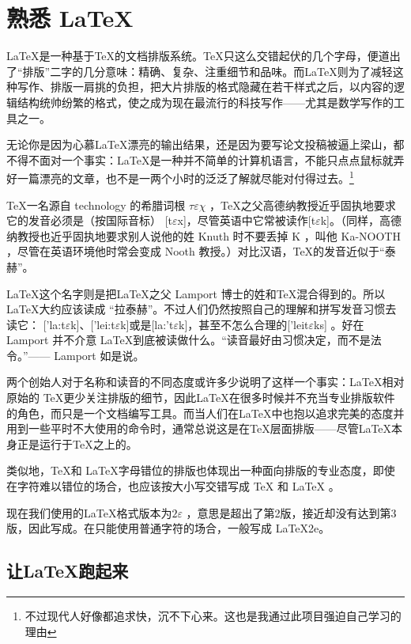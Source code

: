 \chapter{熟悉 \LaTeX}

\LaTeX 是一种基于\TeX 的文档排版系统。\TeX 只这么交错起伏的几个字母，便道出了“排版”二字的几分意味：精确、复杂、注重细节和品味。而\LaTeX 则为了减轻这种写作、排版一肩挑的负担，把大片排版的格式隐藏在若干样式之后，以内容的逻辑结构统帅纷繁的格式，使之成为现在最流行的科技写作——尤其是数学写作的工具之一。

无论你是因为心慕\LaTeX 漂亮的输出结果，还是因为要写论文投稿被逼上梁山，都不得不面对一个事实：\LaTeX 是一种并不简单的计算机语言，不能只点点鼠标就弄好一篇漂亮的文章，也不是一两个小时的泛泛了解就尽能对付得过去。\footnote{不过现代人好像都追求快，沉不下心来。这也是我通过此项目强迫自己学习的理由}

{
    \qquad \TeX 一名源自 technology 的希腊词根 $\tau \varepsilon \chi$ ，\TeX 之父高德纳教授近乎固执地要求它的发音必须是（按国际音标） [t$\varepsilon$x]，尽管英语中它常被读作[t$\varepsilon$k]。（同样，高德纳教授也近乎固执地要求别人说他的姓 Knuth 时不要丢掉 K ，叫他 Ka-NOOTH ，尽管在英语环境他时常会变成 Nooth 教授。）对比汉语，\TeX 的发音近似于“泰赫”。
    
    \qquad \LaTeX 这个名字则是把\LaTeX 之父 Lamport 博士的姓和\TeX 混合得到的。所以\LaTeX 大约应该读成 “拉泰赫”。不过人们仍然按照自己的理解和拼写发音习惯去读它：
    ['la:t$\varepsilon$k]、['lei:t$\varepsilon$k]或是[la:'t$\varepsilon$k]，甚至不怎么合理的['leit$\varepsilon$ks] \footnotemark 。好在 Lamport 并不介意 \LaTeX 到底被读做什么。“读音最好由习惯决定，而不是法令。”—— Lamport 如是说。

    \qquad 两个创始人对于名称和读音的不同态度或许多少说明了这样一个事实：\LaTeX 相对原始的 \TeX 更少关注排版的细节，因此\LaTeX 在很多时候并不充当专业排版软件的角色，而只是一个文档编写工具。而当人们在\LaTeX 中也抱以追求完美的态度并用到一些平时不大使用的命令时，通常总说这是在\TeX 层面排版——尽管\LaTeX 本身正是运行于\TeX 之上的。

    \qquad 类似地，\TeX 和 \LaTeX 字母错位的排版也体现出一种面向排版的专业态度，即使在字符难以错位的场合，也应该按大小写交错写成 TeX 和 LaTeX 。

    \qquad 现在我们使用的\LaTeX 格式版本为$2\varepsilon$ ，意思是超出了第2版，接近却没有达到第3版，因此写成\LaTeXe。在只能使用普通字符的场合，一般写成 LaTeX2e。    
}


\section{让\LaTeX 跑起来}

